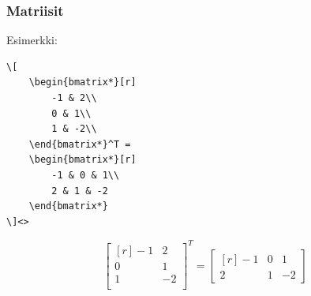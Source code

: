 \begin{fframe}
    \frametitle{Matriisit}

    Esimerkki:\vaihto
    \begin{minipage}{5cm}
        \begin{lstlisting}
\[
    \begin{bmatrix*}[r]
        -1 & 2\\
        0 & 1\\
        1 & -2\\
    \end{bmatrix*}^T = 
    \begin{bmatrix*}[r]
        -1 & 0 & 1\\
        2 & 1 & -2
    \end{bmatrix*}
\]<>
        \end{lstlisting}
    \end{minipage}
    \begin{minipage}{5cm}
        \[
        \begin{bmatrix*}[r]
            -1 & 2\\
            0 & 1\\
            1 & -2\\
        \end{bmatrix*}^T = 
        \begin{bmatrix*}[r]
            -1 & 0 & 1\\
            2 & 1 & -2
        \end{bmatrix*}
        \]
    \end{minipage}
\end{fframe}

